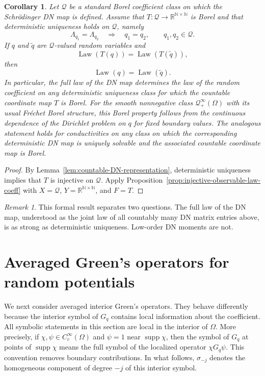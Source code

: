\documentclass[11pt]{article}
\newcommand{\OmegaD}{\Omega}
\newcommand{\R}{\mathbb R}
\newcommand{\Law}{\operatorname{Law}}
\newcommand{\supp}{\operatorname{supp}}
\theoremstyle{plain}
\newtheorem{corollary}[theorem]{Corollary}
\theoremstyle{definition}
\theoremstyle{remark}
\newtheorem{remark}[theorem]{Remark}
\begin{document}
\begin{corollary}\label{cor:law-DN-determines-law-q}
Let $\mathcal Q$ be a standard Borel coefficient class on which the Schr\"odinger DN map is defined.  Assume that $T:\mathcal Q\to\R^{\mathbb N\times\mathbb N}$ is Borel and that deterministic uniqueness holds on $\mathcal Q$, namely
\[
  \Lambda_{q_1}=\Lambda_{q_2}
  \quad\Longrightarrow\quad
  q_1=q_2,
  \qquad q_1,q_2\in\mathcal Q.
\]
If $q$ and $\widetilde q$ are $\mathcal Q$-valued random variables and
\[
  \Law(T(q))=\Law(T(\widetilde q)),
\]
then
\[
  \Law(q)=\Law(\widetilde q).
\]
In particular, the full law of the DN map determines the law of the random coefficient on any deterministic uniqueness class for which the countable coordinate map $T$ is Borel.  For the smooth nonnegative class $\mathcal Q_+^\infty(\OmegaD)$ with its usual Fr\'echet Borel structure, this Borel property follows from the continuous dependence of the Dirichlet problem on $q$ for fixed boundary values.  The analogous statement holds for conductivities on any class on which the corresponding deterministic DN map is uniquely solvable and the associated countable coordinate map is Borel.
\end{corollary}

\begin{proof}
By Lemma~\ref{lem:countable-DN-representation}, deterministic uniqueness implies that $T$ is injective on $\mathcal Q$.  Apply Proposition~\ref{prop:injective-observable-law-coeff} with $X=\mathcal Q$, $Y=\R^{\mathbb N\times\mathbb N}$, and $F=T$.
\end{proof}

\begin{remark}
This formal result separates two questions.  The full law of the DN map, understood as the joint law of all countably many DN matrix entries above, is as strong as deterministic uniqueness.  Low-order DN moments are not.
\end{remark}

\section{Averaged Green's operators for random potentials}
\label{sec:Green-potential}

We next consider averaged interior Green's operators.  They behave differently because the interior symbol of $G_q$ contains local information about the coefficient.  All symbolic statements in this section are local in the interior of $\OmegaD$.  More precisely, if $\chi,\psi\in C_c^\infty(\OmegaD)$ and $\psi=1$ near $\supp\chi$, then the symbol of $G_q$ at points of $\supp\chi$ means the full symbol of the localized operator $\chi G_q\psi$.  This convention removes boundary contributions.  In what follows, $\sigma_{-j}$ denotes the homogeneous component of degree $-j$ of this interior symbol.
\end{document}
